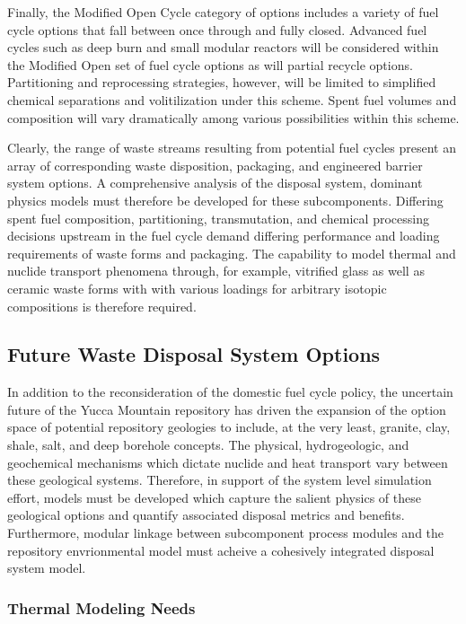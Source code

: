 Finally, the Modified Open Cycle category of options includes a 
variety of fuel cycle options that fall between once through and fully 
closed. Advanced fuel cycles such as deep burn and small modular 
reactors will be considered within the Modified Open set of fuel cycle 
options as will partial recycle options. Partitioning and reprocessing 
strategies, however, will be limited to simplified chemical 
separations and volitilization under this scheme. Spent fuel volumes 
and composition will vary dramatically among various possibilities 
within this scheme. \cite{DOE_roadmap} 

Clearly, the range of waste streams resulting from potential fuel 
cycles present an array of corresponding waste disposition, packaging, 
and engineered barrier system options. A comprehensive analysis of the 
disposal system, dominant physics models must therefore be developed 
for these subcomponents.  Differing spent fuel composition, 
partitioning, transmutation, and chemical processing decisions 
upstream in the fuel cycle demand differing performance and loading 
requirements of waste forms and packaging. The capability to model 
thermal and nuclide transport phenomena through, for example, 
vitrified glass as well as ceramic waste forms with with various 
loadings for arbitrary isotopic compositions is therefore required.  

\subsection{Future Waste Disposal System Options}

In addition to the reconsideration of the domestic fuel cycle policy, 
the uncertain future of the Yucca Mountain repository has driven the 
expansion of the option space of potential repository geologies to 
include, at the very least, granite, clay, shale, salt, and deep 
borehole concepts. The physical, hydrogeologic, and geochemical 
mechanisms which dictate nuclide and heat transport vary between these 
geological systems.  Therefore, in support of the system level 
simulation effort, models must be developed which capture the salient 
physics of these geological options and quantify associated disposal 
metrics and benefits.  Furthermore, modular linkage between 
subcomponent process modules and the repository envrionmental model 
must acheive a cohesively integrated disposal system model. 


\subsubsection{Thermal Modeling Needs}

